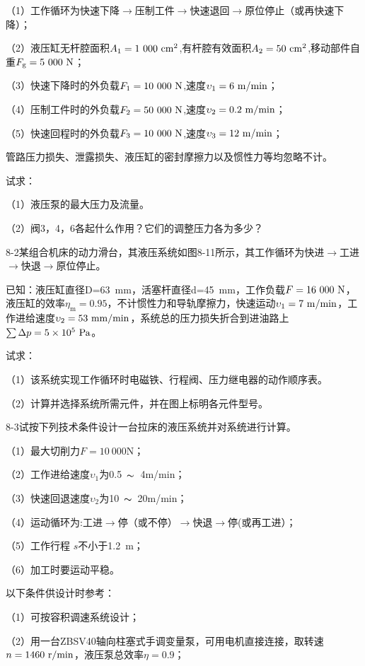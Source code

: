 （1）工作循环为快速下降$\rightarrow $压制工件$\rightarrow $快速退回$\rightarrow $原位停止（或再快速下降）；

（2）液压缸无杆腔面积$A_\text{1}=1\ 000\ \rm cm^2$,有杆腔有效面积$A_\text{2}=50\ \rm cm^2$,移动部件自重$F_\text{g}=5\ 000\ \rm N$；

（3）快速下降时的外负载$F_\text{1}=10\ 000\ \rm N$,速度$\upsilon_\text{1}=6\ \rm m/min$；

（4）压制工件时的外负载$F_\text{2}=50\ 000\ \rm N$,速度$\upsilon_\text{2}=0.2\ \rm m/min$；

（5）快速回程时的外负载$F_\text{3}=10\ 000\ \rm N$,速度$\upsilon_\text{3}=12\ \rm m/min$；

管路压力损失、泄露损失、液压缸的密封摩擦力以及惯性力等均忽略不计。

试求：

（1）液压泵的最大压力及流量。

（2）阀3，4，6各起什么作用？它们的调整压力各为多少？

8-2\qquad 某组合机床的动力滑台，其液压系统如图8-11所示，其工作循环为快进$\rightarrow $工进$\rightarrow $快退$\rightarrow $原位停止。

已知：液压缸直径D=63\ mm，活塞杆直径d=45\ mm，工作负载$F=16\ 000\ \rm N$，液压缸的效率$\eta_\text{m}=0.95$，不计惯性力和导轨摩擦力，快速运动$\upsilon_\text{1}=7\ \rm m/min$，工作进给速度$\upsilon_\text{2}=53\ \rm mm/min$，系统总的压力损失折合到进油路上$\sum \Delta p=5\times10^5\ \rm Pa$。

试求：

（1）该系统实现工作循环时电磁铁、行程阀、压力继电器的动作顺序表。

（2）计算并选择系统所需元件，并在图上标明各元件型号。

8-3\qquad 试按下列技术条件设计一台拉床的液压系统并对系统进行计算。

（1）最大切削力$F=10\ 000$N；

（2）工作进给速度$\upsilon_\text{1}$为0.5\ $\thicksim$\ 4m/min；

（3）快速回退速度$\upsilon_\text{2}$为10\ $\thicksim$\ 20m/min；

（4）运动循环为:工进$\rightarrow $停（或不停）$\rightarrow $快退$\rightarrow $停(或再工进）；

（5）工作行程 $s$不小于1.2\ m；

（6）加工时要运动平稳。

以下条件供设计时参考：

（1）可按容积调速系统设计；

（2）用一台ZBSV40轴向柱塞式手调变量泵，可用电机直接连接，取转速$n=1460\rm \ r/min$，液压泵总效率$\eta=0.9$；

